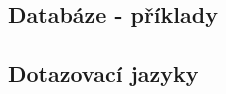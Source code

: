 




\subsection{Databáze - příklady}
\label{sec:gdb-databaze}









\subsection{Dotazovací jazyky}






 



